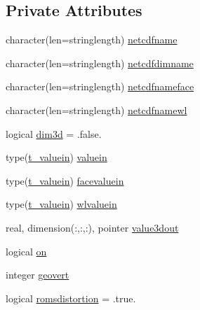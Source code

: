 \subsection*{Private Attributes}
\begin{DoxyCompactItemize}
\item 
character(len=stringlength) \mbox{\hyperlink{structmodulenetcdfcf__2__hdf5mohid_1_1t__depth_aaba249c3638b0814ed75bcec3ac6a02a}{netcdfname}}
\item 
character(len=stringlength) \mbox{\hyperlink{structmodulenetcdfcf__2__hdf5mohid_1_1t__depth_a81698ba028128362d7c6c69dac788d78}{netcdfdimname}}
\item 
character(len=stringlength) \mbox{\hyperlink{structmodulenetcdfcf__2__hdf5mohid_1_1t__depth_a05fc00c731b0ecf13a45192d834a3ced}{netcdfnameface}}
\item 
character(len=stringlength) \mbox{\hyperlink{structmodulenetcdfcf__2__hdf5mohid_1_1t__depth_ae1cd03b46eb2b6da4c7e39e2e35c8290}{netcdfnamewl}}
\item 
logical \mbox{\hyperlink{structmodulenetcdfcf__2__hdf5mohid_1_1t__depth_a731dabea60cff391370f3e1356138022}{dim3d}} = .false.
\item 
type(\mbox{\hyperlink{structmodulenetcdfcf__2__hdf5mohid_1_1t__valuein}{t\+\_\+valuein}}) \mbox{\hyperlink{structmodulenetcdfcf__2__hdf5mohid_1_1t__depth_a3ecba39a77d8222a575e631e506e0cce}{valuein}}
\item 
type(\mbox{\hyperlink{structmodulenetcdfcf__2__hdf5mohid_1_1t__valuein}{t\+\_\+valuein}}) \mbox{\hyperlink{structmodulenetcdfcf__2__hdf5mohid_1_1t__depth_af2122999cd0d555b28b44e556cbd1e87}{facevaluein}}
\item 
type(\mbox{\hyperlink{structmodulenetcdfcf__2__hdf5mohid_1_1t__valuein}{t\+\_\+valuein}}) \mbox{\hyperlink{structmodulenetcdfcf__2__hdf5mohid_1_1t__depth_ad64cc4dbad47dfc845ff380a2e661686}{wlvaluein}}
\item 
real, dimension(\+:,\+:,\+:), pointer \mbox{\hyperlink{structmodulenetcdfcf__2__hdf5mohid_1_1t__depth_ac0f6bc0a6b97fef24518237d34721717}{value3dout}}
\item 
logical \mbox{\hyperlink{structmodulenetcdfcf__2__hdf5mohid_1_1t__depth_a6816685f86df6689e56f51b69c1e3c9a}{on}}
\item 
integer \mbox{\hyperlink{structmodulenetcdfcf__2__hdf5mohid_1_1t__depth_ae8a2e612662265c51f7611c24772ecea}{geovert}}
\item 
logical \mbox{\hyperlink{structmodulenetcdfcf__2__hdf5mohid_1_1t__depth_adf55115a3cc10db57e44c61a4147b318}{romsdistortion}} = .true.

\end{DoxyCompactItemize}
